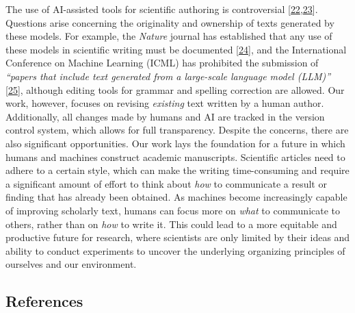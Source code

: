 \documentclass[
]{article}
\begin{document}
The use of AI-assisted tools for scientific authoring is controversial {[}\protect\hyperlink{ref-1EAonKBXJ}{22},\protect\hyperlink{ref-KJTJqmxc}{23}{]}.
Questions arise concerning the originality and ownership of texts generated by these models.
For example, the \emph{Nature} journal has established that any use of these models in scientific writing must be documented {[}\protect\hyperlink{ref-wQLVc4o7}{24}{]}, and the International Conference on Machine Learning (ICML) has prohibited the submission of \emph{``papers that include text generated from a large-scale language model (LLM)''} {[}\protect\hyperlink{ref-K58CKD6D}{25}{]}, although editing tools for grammar and spelling correction are allowed.
Our work, however, focuses on revising \emph{existing} text written by a human author.
Additionally, all changes made by humans and AI are tracked in the version control system, which allows for full transparency.
Despite the concerns, there are also significant opportunities.
Our work lays the foundation for a future in which humans and machines construct academic manuscripts.
Scientific articles need to adhere to a certain style, which can make the writing time-consuming and require a significant amount of effort to think about \emph{how} to communicate a result or finding that has already been obtained.
As machines become increasingly capable of improving scholarly text, humans can focus more on \emph{what} to communicate to others, rather than on \emph{how} to write it.
This could lead to a more equitable and productive future for research, where scientists are only limited by their ideas and ability to conduct experiments to uncover the underlying organizing principles of ourselves and our environment.

\hypertarget{references}{%
\subsection{References}\label{references}}
\end{document}

